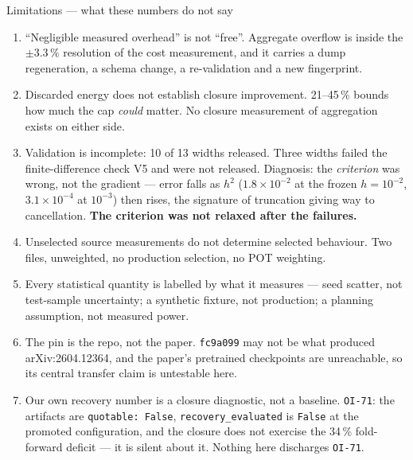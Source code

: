 \documentclass[aspectratio=169,10pt]{beamer}
\newcommand{\warn}[1]{\textcolor{warn}{#1}}
\begin{document}
\begin{frame}{Limitations --- what these numbers do not say}
  \begin{enumerate}\small
    \item \warn{``Negligible measured overhead'' is not ``free''.} Aggregate overflow is
      inside the $\pm3.3\,\%$ resolution of the cost measurement, and it carries a
      dump regeneration, a schema change, a re-validation and a new fingerprint.
    \item \warn{Discarded energy does not establish closure improvement.} 21--45\,\%
      bounds how much the cap \emph{could} matter. No closure measurement of aggregation
      exists on either side.
    \item \warn{Validation is incomplete: 10 of 13 widths released.} Three widths failed
      the finite-difference check V5 and were not released. Diagnosis: the
      \emph{criterion} was wrong, not the gradient --- error falls as $h^2$
      ($1.8\!\times\!10^{-2}$ at the frozen $h{=}10^{-2}$, $3.1\!\times\!10^{-4}$ at
      $10^{-3}$) then rises, the signature of truncation giving way to cancellation.
      \textbf{The criterion was not relaxed after the failures.}
    \item \warn{Unselected source measurements do not determine selected behaviour.}
      Two files, unweighted, no production selection, no POT weighting.
    \item \warn{Every statistical quantity is labelled by what it measures} --- seed
      scatter, not test-sample uncertainty; a synthetic fixture, not production; a
      planning assumption, not measured power.
    \item \warn{The pin is the repo, not the paper.} \texttt{fc9a099} may not be what
      produced arXiv:2604.12364, and \warn{the paper's pretrained checkpoints are
      unreachable}, so its central transfer claim is untestable here.
    \item \warn{Our own recovery number is a closure diagnostic, not a baseline.}
      \texttt{OI-71}: the artifacts are \texttt{quotable: False},
      \texttt{recovery\_evaluated} is \texttt{False} at the promoted configuration, and
      the closure \warn{does not exercise the 34\,\% fold-forward deficit} --- it is
      silent about it. Nothing here discharges \texttt{OI-71}.
  \end{enumerate}
\end{frame}
\end{document}
